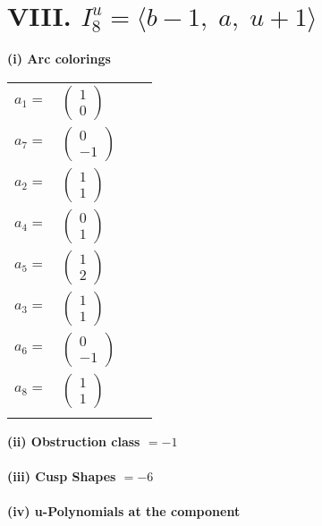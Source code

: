 \documentclass[1p]{elsarticle_modified}
\theoremstyle{definition}
\begin{document}
\centering \section*{VIII. $I^u_{8}= \langle b-1,\;a,\;u+1 \rangle$}
\flushleft \textbf{(i) Arc colorings}\\
\begin{tabular}{m{7pt} m{180pt} m{7pt} m{180pt} }
\flushright $a_{1}=$&$\begin{pmatrix}1\\0\end{pmatrix}$ \\
\flushright $a_{7}=$&$\begin{pmatrix}0\\-1\end{pmatrix}$ \\
\flushright $a_{2}=$&$\begin{pmatrix}1\\1\end{pmatrix}$ \\
\flushright $a_{4}=$&$\begin{pmatrix}0\\1\end{pmatrix}$ \\
\flushright $a_{5}=$&$\begin{pmatrix}1\\2\end{pmatrix}$ \\
\flushright $a_{3}=$&$\begin{pmatrix}1\\1\end{pmatrix}$ \\
\flushright $a_{6}=$&$\begin{pmatrix}0\\-1\end{pmatrix}$ \\
\flushright $a_{8}=$&$\begin{pmatrix}1\\1\end{pmatrix}$\\&\end{tabular}
\flushleft \textbf{(ii) Obstruction class $= -1$}\\~\\
\flushleft \textbf{(iii) Cusp Shapes $= -6$}\\~\\
\newpage\renewcommand{\arraystretch}{1}
\flushleft \textbf{(iv) u-Polynomials at the component}\newline \\
\end{document}
